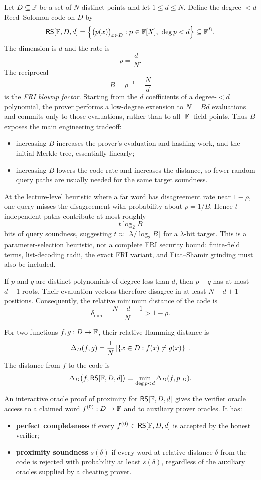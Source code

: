 Let $D\subseteq\mathbb{F}$ be a set of $N$ distinct points and let $1\le d\le N$. Define the
degree-$<d$ Reed--Solomon code on $D$ by
\[
    \mathsf{RS}[\mathbb{F},D,d]
    =\left\{\bigl(p(x)\bigr)_{x\in D}:p\in\mathbb{F}[X],\ \deg p<d\right\}
    \subseteq \mathbb{F}^D.
\]
The dimension is $d$ and the rate is
\[
    \rho=\frac{d}{N}.
\]
The reciprocal
\[
    B=\rho^{-1}=\frac{N}{d}
\]
is the \emph{FRI blowup factor}. Starting from the $d$ coefficients of a degree-$<d$
polynomial, the prover performs a low-degree extension to $N=Bd$ evaluations and commits
only to those evaluations, rather than to all $|\mathbb{F}|$ field points. Thus $B$ exposes the main
engineering tradeoff:
\begin{itemize}[leftmargin=2em]
    \item increasing $B$ increases the prover's evaluation and hashing work, and the initial
    Merkle tree, essentially linearly;
    \item increasing $B$ lowers the code rate and increases the distance, so fewer random
    query paths are usually needed for the same target soundness.
\end{itemize}
At the lecture-level heuristic where a far word has disagreement rate near $1-\rho$, one
query misses the disagreement with probability about $\rho=1/B$. Hence $t$ independent
paths contribute at most roughly
\[
    t\log_2 B
\]
bits of query soundness, suggesting $t\approx\lceil\lambda/\log_2B\rceil$ for a
$\lambda$-bit target. This is a parameter-selection heuristic, not a complete FRI security
bound: finite-field terms, list-decoding radii, the exact FRI variant, and Fiat--Shamir
grinding must also be included.

If $p$ and $q$ are distinct polynomials of degree less than $d$, then $p-q$ has at most
$d-1$ roots. Their evaluation vectors therefore disagree in at least $N-d+1$ positions.
Consequently, the relative minimum distance of the code is
\[
    \delta_{\min}=\frac{N-d+1}{N}>1-\rho.
\]

For two functions $f,g:D\to\mathbb{F}$, their relative Hamming distance is
\[
    \Delta_D(f,g)
    =\frac{1}{N}\left|\left\{x\in D:f(x)\neq g(x)\right\}\right|.
\]
The distance from $f$ to the code is
\[
    \Delta_D\bigl(f,\mathsf{RS}[\mathbb{F},D,d]\bigr)
    =\min_{\deg p<d}\Delta_D(f,p|_D).
\]

\begin{definition}
An interactive oracle proof of proximity for $\mathsf{RS}[\mathbb{F},D,d]$ gives the verifier oracle access
to a claimed word $f^{(0)}:D\to\mathbb{F}$ and to auxiliary prover oracles. It has:
\begin{itemize}[leftmargin=2em]
    \item \textbf{perfect completeness} if every $f^{(0)}\in\mathsf{RS}[\mathbb{F},D,d]$ is accepted by
    the honest verifier;
    \item \textbf{proximity soundness} $s(\delta)$ if every word at relative distance
    $\delta$ from the code is rejected with probability at least $s(\delta)$, regardless of
    the auxiliary oracles supplied by a cheating prover.
\end{itemize}
\end{definition}


